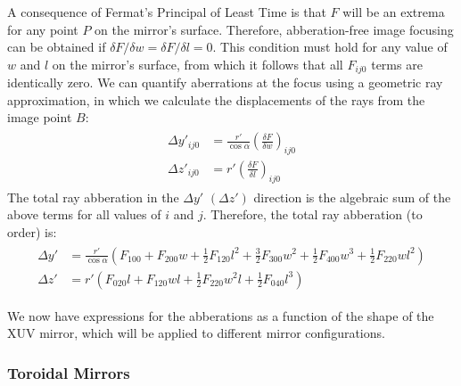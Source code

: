 A consequence of Fermat's Principal of Least Time is that $F$ will be an extrema for any point $P$ on the mirror's surface. Therefore, abberation-free image focusing can be obtained if $\delta F/\delta w = \delta F / \delta l = 0$. This condition must hold for any value of $w$ and $l$ on the mirror's surface, from which it follows that all $F_{ij0}$ terms are identically zero. We can quantify aberrations at the focus using a geometric ray approximation, in which we calculate the displacements of the rays from the image point $B$:
\begin{gather}
\begin{aligned}
\Delta y'_{ij0} &= \frac{r'}{\cos \alpha} \left( \frac{\delta F}{\delta w} \right)_{ij0} \\
\Delta z'_{ij0} &= r' \left( \frac{\delta F}{\delta l} \right)_{ij0}
\end{aligned}
\end{gather}
The total ray abberation in the $\Delta y'$ $(\Delta z')$ direction is the algebraic sum of the above terms for all values of $i$ and $j$. Therefore, the total ray abberation (to  order) is:
\begin{gather}
\begin{aligned}
\Delta y' &= \frac{r'}{\cos \alpha} \left( F_{100} + F_{200} w + \frac{1}{2} F_{120} l^2 + \frac{3}{2} F_{300} w^2  + \frac{1}{2} F_{400} w^3 + \frac{1}{2} F_{220} w l^2 \right) \\
\Delta z' &= r' \left( F_{020} l + F_{120} w l + \frac{1}{2} F_{220} w^2 l + \frac{1}{2} F_{040} l^3 \right)
\end{aligned}
\label{eqn:abberation_expansion}
\end{gather}

We now have expressions for the abberations as a function of the shape of the XUV mirror, which will be applied to different mirror configurations.

\subsubsection{Toroidal Mirrors}

